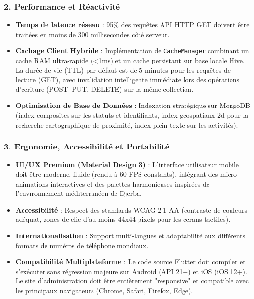 \documentclass[12pt,a4paper]{report}
\begin{document}
\subsubsection{2. Performance et Réactivité}
\begin{itemize}[label=\textbullet]
    \item \textbf{Temps de latence réseau} : 95\% des requêtes API HTTP GET doivent être traitées en moins de 300 millisecondes côté serveur.
    \item \textbf{Cachage Client Hybride} : Implémentation de \texttt{CacheManager} combinant un cache RAM ultra-rapide (<1ms) et un cache persistant sur base locale Hive. La durée de vie (TTL) par défaut est de 5 minutes pour les requêtes de lecture (GET), avec invalidation intelligente immédiate lors des opérations d'écriture (POST, PUT, DELETE) sur la même collection.
    \item \textbf{Optimisation de Base de Données} : Indexation stratégique sur MongoDB (index composites sur les statuts et identifiants, index géospatiaux 2d pour la recherche cartographique de proximité, index plein texte sur les activités).
\end{itemize}

\subsubsection{3. Ergonomie, Accessibilité et Portabilité}
\begin{itemize}[label=\textbullet]
    \item \textbf{UI/UX Premium (Material Design 3)} : L'interface utilisateur mobile doit être moderne, fluide (rendu à 60 FPS constants), intégrant des micro-animations interactives et des palettes harmonieuses inspirées de l'environnement méditerranéen de Djerba.
    \item \textbf{Accessibilité} : Respect des standards WCAG 2.1 AA (contraste de couleurs adéquat, zones de clic d'au moins 44x44 pixels pour les écrans tactiles).
    \item \textbf{Internationalisation} : Support multi-langues et adaptabilité aux différents formats de numéros de téléphone mondiaux.
    \item \textbf{Compatibilité Multiplateforme} : Le code source Flutter doit compiler et s'exécuter sans régression majeure sur Android (API 21+) et iOS (iOS 12+). Le site d'administration doit être entièrement "responsive" et compatible avec les principaux navigateurs (Chrome, Safari, Firefox, Edge).
\end{itemize}
\end{document}
